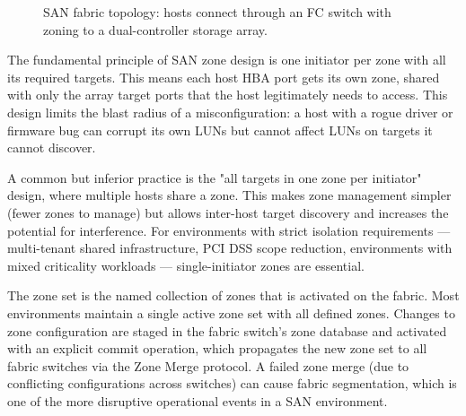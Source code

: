 \begin{figure}[htbp]
\caption{SAN fabric topology: hosts connect through an FC switch with zoning to a dual-controller storage array.}
\label{fig:san-fabric}
\end{figure}

The fundamental principle of SAN zone design is one initiator per zone with all its required targets. This means each host HBA port gets its own zone, shared with only the array target ports that the host legitimately needs to access. This design limits the blast radius of a misconfiguration: a host with a rogue driver or firmware bug can corrupt its own LUNs but cannot affect LUNs on targets it cannot discover.

A common but inferior practice is the "all targets in one zone per initiator" design, where multiple hosts share a zone. This makes zone management simpler (fewer zones to manage) but allows inter-host target discovery and increases the potential for interference. For environments with strict isolation requirements --- multi-tenant shared infrastructure, PCI DSS scope reduction, environments with mixed criticality workloads --- single-initiator zones are essential.

The zone set is the named collection of zones that is activated on the fabric. Most environments maintain a single active zone set with all defined zones. Changes to zone configuration are staged in the fabric switch's zone database and activated with an explicit commit operation, which propagates the new zone set to all fabric switches via the Zone Merge protocol. A failed zone merge (due to conflicting configurations across switches) can cause fabric segmentation, which is one of the more disruptive operational events in a SAN environment.

